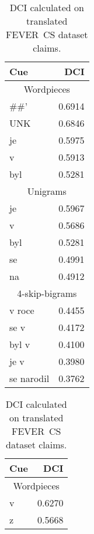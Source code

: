     
    \begin{table}[ht]
        \parbox{.45\linewidth}{
            \centering
            \begin{tabular}{lr}
                \toprule
                          Cue &     DCI \\
                \midrule
                \multicolumn{2}{c}{Wordpieces} \\
                         \#\#' &  0.6914 \\
                            UNK &  0.6846 \\
                            je &  0.5975 \\
                             v &  0.5913 \\
                           byl &  0.5281 \\
                \midrule
                \multicolumn{2}{c}{Unigrams} \\
                            je &  0.5967 \\
                             v &  0.5686 \\
                           byl &  0.5281 \\
                            se &  0.4991 \\
                            na &  0.4912 \\
                \midrule
                \multicolumn{2}{c}{4-skip-bigrams} \\
                        v roce &  0.4455 \\
                         se v &  0.4172 \\
                        byl v &  0.4100 \\
                         je v &  0.3980 \\
                   se narodil &  0.3762 \\
                \bottomrule
            \end{tabular}
            \caption{DCI calculated on translated FEVER~CS dataset claims.}
            \label{table:claim-quality-fever-dci}
        }
        \hfill
        \parbox{.45\linewidth}{
        \centering
        \begin{tabular}{lr}
            \toprule
              Cue &     DCI \\
            \midrule
            \multicolumn{2}{c}{Wordpieces} \\
                v & 0.6270 \\
                z & 0.5668 \\

\end{tabular}}
\end{table}
